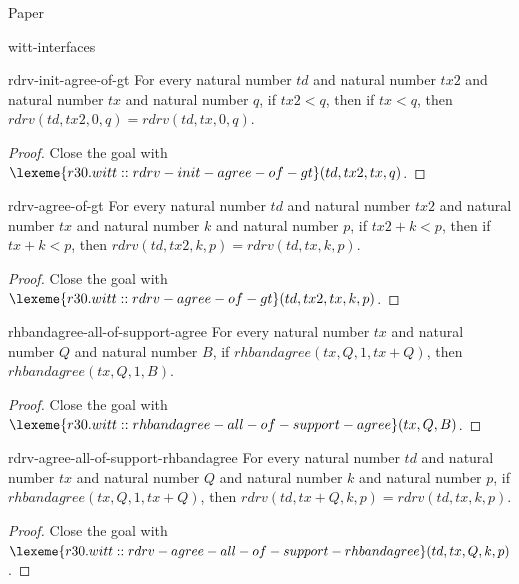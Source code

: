 \begin{lexlean}{Paper}
\begin{section}{witt-interfaces}
  \begin{theorem}{rdrv-init-agree-of-gt}
  For every natural number \(td\) and natural number \(tx2\) and natural number \(tx\) and natural number \(q\), if \(tx2 < q\), then if \(tx < q\), then \(rdrv(td, tx2, 0, q) = rdrv(td, tx, 0, q)\).
  \begin{proof}
  Close the goal with \(\lexeme{r30.witt::rdrv-init-agree-of-gt}(td, tx2, tx, q)\).
  \end{proof}
  \end{theorem}

  \begin{theorem}{rdrv-agree-of-gt}
  For every natural number \(td\) and natural number \(tx2\) and natural number \(tx\) and natural number \(k\) and natural number \(p\), if \(tx2 + k < p\), then if \(tx + k < p\), then \(rdrv(td, tx2, k, p) = rdrv(td, tx, k, p)\).
  \begin{proof}
  Close the goal with \(\lexeme{r30.witt::rdrv-agree-of-gt}(td, tx2, tx, k, p)\).
  \end{proof}
  \end{theorem}

  \begin{theorem}{rhbandagree-all-of-support-agree}
  For every natural number \(tx\) and natural number \(Q\) and natural number \(B\), if \(rhbandagree(tx, Q, 1, tx + Q)\), then \(rhbandagree(tx, Q, 1, B)\).
  \begin{proof}
  Close the goal with \(\lexeme{r30.witt::rhbandagree-all-of-support-agree}(tx, Q, B)\).
  \end{proof}
  \end{theorem}

  \begin{theorem}{rdrv-agree-all-of-support-rhbandagree}
  For every natural number \(td\) and natural number \(tx\) and natural number \(Q\) and natural number \(k\) and natural number \(p\), if \(rhbandagree(tx, Q, 1, tx + Q)\), then \(rdrv(td, tx + Q, k, p) = rdrv(td, tx, k, p)\).
  \begin{proof}
  Close the goal with \(\lexeme{r30.witt::rdrv-agree-all-of-support-rhbandagree}(td, tx, Q, k, p)\).
  \end{proof}
  \end{theorem}


\end{section}
\end{lexlean}
